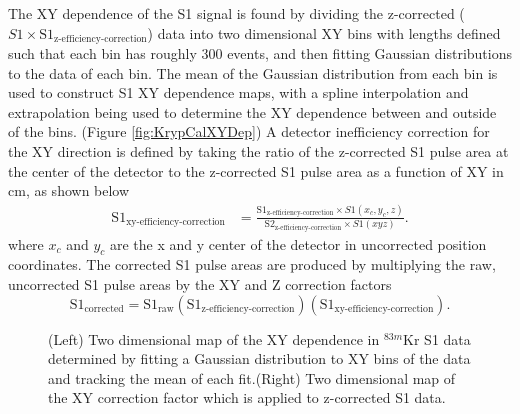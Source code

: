 \documentclass[a4paper,12pt]{article}
\begin{document}
{The XY dependence of the S1 signal is found by dividing the z-corrected ($S1 \times \mbox{S}1_{\mbox{z-efficiency-correction}}$) data into two dimensional XY bins with lengths defined such that each bin has roughly 300 events, and then fitting Gaussian distributions to the data of each bin.  The mean of the Gaussian distribution from each bin is used to construct S1 XY dependence maps, with a spline interpolation and extrapolation being used to determine the XY dependence between and outside of the bins. (Figure \ref{fig:KrypCalXYDep}) A detector inefficiency correction for the XY direction is defined by taking the ratio of the z-corrected S1 pulse area at the center of the detector to the z-corrected S1 pulse area as a function of XY in cm, as shown below
\begin{align}
\mbox{S}1_{\mbox{xy-efficiency-correction}} &= \frac{\mbox{S}1_{\mbox{z-efficiency-correction}}\times S1(x_c,y_c,z)}{\mbox{S}2_{\mbox{z-efficiency-correction}}\times S1(xyz)}.
\end{align} 
where $x_c$ and $y_c$ are the x and y center of the detector in uncorrected position coordinates. The corrected S1 pulse areas are produced by multiplying the raw, uncorrected S1 pulse areas by the XY and Z correction factors
\begin{equation}
\mbox{S}1_{\mbox{corrected}} = \mbox{S}1_{\mbox{raw}} \left( \mbox{S}1_{\mbox{z-efficiency-correction}} \right) \left( \mbox{S}1_{\mbox{xy-efficiency-correction}} \right).
\end{equation}

\begin{figure} 
\centering
{}
\qquad
{}
\caption{ (Left) Two dimensional map of the XY dependence in $^{83m}$Kr S1 data determined by fitting a Gaussian distribution to XY bins of the data and tracking the mean of each fit.(Right) Two dimensional map of the XY correction factor which is applied to z-corrected S1 data.}
\label{fig:KrypCalS1XYDep}
\end{figure}


}
\end{document}
